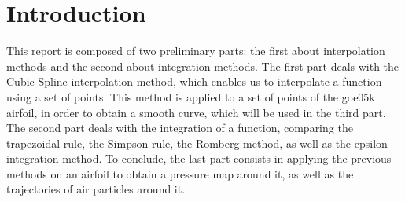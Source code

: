 \section*{Introduction}

This report is composed of two preliminary parts: the first about interpolation methods and the second about integration methods.
\medbreak
The first part deals with the Cubic Spline interpolation method, which enables us to interpolate a function using a set of points.
This method is applied to a set of points of the goe05k airfoil, in order to obtain a smooth curve, which will be used in the third part.
\medbreak
The second part deals with the integration of a function, comparing the trapezoidal rule, the Simpson rule, the Romberg method, as well as the epsilon-integration method.
\medbreak
To conclude, the last part consists in applying the previous methods on an airfoil to obtain a pressure map around it, as well as the trajectories of air particles around it.
